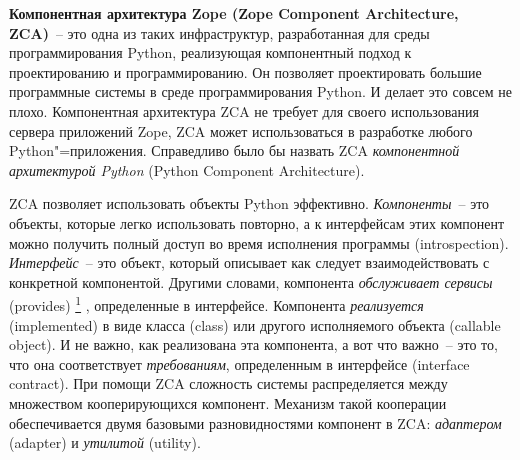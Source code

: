 \documentclass[a4paper,openany,twoside,final]{book}
\providecommand*{\DUfootnotemark}[3]{%
  \raisebox{1em}{\hypertarget{#1}{}}%
  \hyperlink{#2}{\textsuperscript{#3}}%
}
\providecommand*{\DUroletitlereference}[1]{\textsl{#1}}
\begin{document}
\textbf{Компонентная архитектура Zope (Zope Component Architecture, ZCA)}~-- это одна из таких инфраструктур, разработанная для среды программирования Python, реализующая компонентный подход к проектированию и программированию.  Он позволяет проектировать большие программные системы в среде программирования Python.  И делает это совсем не плохо.  Компонентная архитектура ZCA не требует для своего использования сервера приложений Zope, ZCA может использоваться в разработке любого Python"=приложения.  Справедливо было бы назвать ZCA \DUroletitlereference{компонентной архитектурой Python} (Python Component Architecture).

ZCA позволяет использовать объекты Python эффективно.  \DUroletitlereference{Компоненты}~-- это объекты, которые легко использовать повторно, а к интерфейсам этих компонент можно получить полный доступ во время исполнения программы (introspection).  \DUroletitlereference{Интерфейс}~-- это объект, который описывает как следует взаимодействовать с конкретной компонентой.  Другими словами, компонента \DUroletitlereference{обслуживает сервисы} (provides)\DUfootnotemark{id3}{fn1}{1}, определенные в интерфейсе.  Компонента \DUroletitlereference{реализуется} (implemented) в виде класса (class) или другого исполняемого объекта (callable object).  И не важно, как реализована эта компонента, а вот что важно~-- это то, что она соответствует \DUroletitlereference{требованиям}, определенным в интерфейсе (interface contract).  При помощи ZCA сложность системы распределяется между множеством кооперирующихся компонент.  Механизм такой кооперации обеспечивается двумя базовыми разновидностями компонент в ZCA: \DUroletitlereference{адаптером} (adapter) и \DUroletitlereference{утилитой} (utility).
\end{document}

